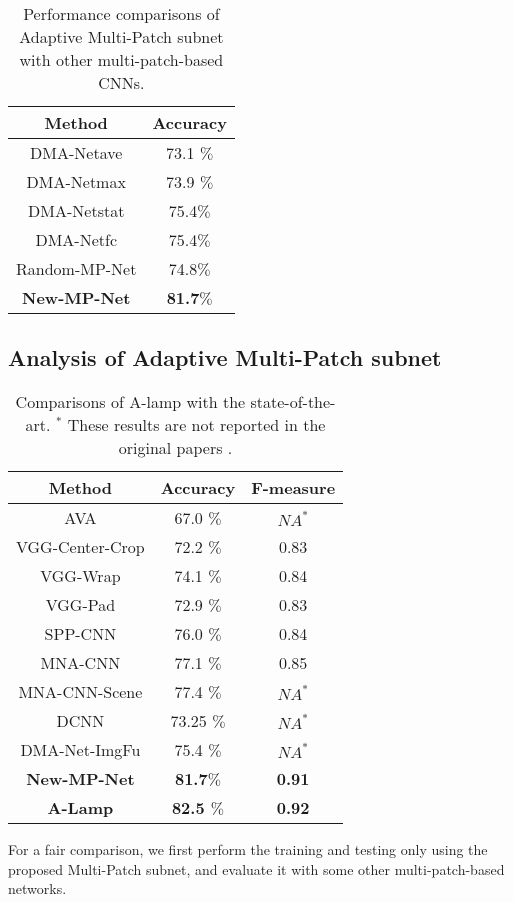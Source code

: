 \documentclass[10pt,twocolumn,letterpaper]{article}
\begin{document}
	\begin{table}
		\begin{center}	
			\begin{tabular}{||c|c||} 
				\hline
				Method & Accuracy \\
				\hline\hline
				DMA-Net{\tiny ave} & 73.1 $\%$ \\
				DMA-Net{\tiny max} & 73.9 $\%$ \\
				DMA-Net{\tiny stat} & 75.4$\% $ \\
				DMA-Net{\tiny fc} & 75.4$\% $ \\
				\hline
				Random-MP-Net & 74.8$\%$ \\
				\textbf{New-MP-Net} & \textbf{81.7$\% $}\\
				\hline
			\end{tabular} 
		\end{center} 
		\caption{Performance comparisons of Adaptive Multi-Patch subnet with other multi-patch-based CNNs.}
		\label{tabel1} 
		\vspace{-3mm}
	\end{table}
	
\subsection{Analysis of Adaptive Multi-Patch subnet}
\begin{table}
		\begin{center}
			\begin{tabular}{||c|c|c||} 
				\hline
				Method & Accuracy & F-measure\\
				\hline\hline
				AVA & 67.0 $\%$ & $N{A^ * }$  \\
				VGG-Center-Crop & 72.2 $\%$ & 0.83 \\
				VGG-Wrap & 74.1 $\%$ & 0.84 \\
				VGG-Pad & 72.9 $\%$ & 0.83 \\
				\hline
				SPP-CNN & 76.0 $\%$ & 0.84 \\
				MNA-CNN & 77.1 $\%$ & 0.85 \\
				MNA-CNN-Scene & 77.4 $\%$ & $N{A^ * }$ \\
DCNN & 73.25 $\%$ & $N{A^ * }$ \\
				DMA-Net-ImgFu & 75.4 $\%$ & $N{A^ * }$\\
				\hline\hline
				\textbf{New-MP-Net} & \textbf{81.7$\% $} & \textbf{0.91} \\
				\textbf{A-Lamp} & \textbf{82.5 $\%$} & \textbf{0.92} \\
				\hline
			\end{tabular} 
		\end{center}
		\caption{Comparisons of A-lamp with the state-of-the-art. $^*$ These results are not reported in the original papers \cite{Lu:2015:ICCV,Lu:2014:TMM:rating,Mai:2016:CVPR,Murray:MMP2012:AVA}.}
		\label{tabel2}
		\vspace{-3mm}
	\end{table} 
For a fair comparison, we first perform the training and testing only using the proposed Multi-Patch subnet, and evaluate it with some other multi-patch-based networks. 
	
\end{document}
